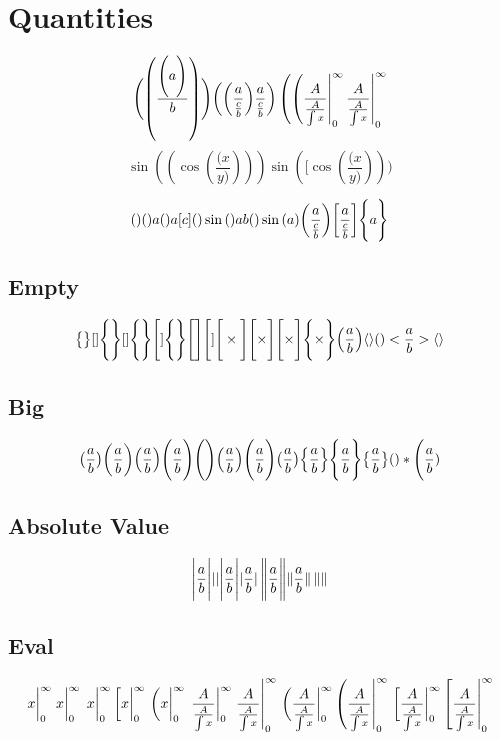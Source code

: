 \documentclass{article}
\begin{document}
\section*{Quantities}

\[
  \pqty\Bigg{\pqty{\frac{\pqty\Bigg{a}}{b}}}
  \qty(  \qty(\frac{a}{\frac{c}{b}})\frac{a}{\frac{c}{b}})
    \eval(  \eval(\frac{A}{\frac{A}{\int x}}|_0^\infty\frac{A}{\frac{A}{\int x}}|_0^\infty
  \]
\[
  \sin((\cos({\frac{(x}{y)}})))
  \sin([\cos({\frac{(x}{y)}})))
\]



\[
  \quantity
  \quantity a
  \quantity\bigg a
  \quantity[c]
  \quantity\sin
  \qty\Bigg ab
  \quantity\bigg\sin
  \qty(a)
  \qty(\frac{a}{\frac{c}{b}})
  \qty[\frac{a}{\frac{c}{b}}]
  \qty\Bigg{a}
\]

\subsection*{Empty}

\[
  \qty\big{}[]
  \qty\Bigg{}[]
  \qty\Bigg{}\Bigg[]
  \qty\Bigg{}\qty\Bigg[]
  \Bigg[]
  \Bigg[ \times \Bigg]
  \Biggl[ \times \Biggr]
  \qty\Bigg[\times]
  \qty\Bigg{\times}
  \qty(\frac{a}{b})\langle\rangle
  \qty<\frac{a}{b}>\langle\rangle
\]

\subsection*{Big}

\[
  \quantity\big(\frac{a}{b})
  \quantity\bigg(\frac{a}{b})
  \quantity\Big(\frac{a}{b})
  \quantity\Bigg(\frac{a}{b})
  \pqty\Bigg{} 
  \pqty{\frac{a}{b}}
  \pqty\Bigg{\frac{a}{b}}
  \pqty\big{\frac{a}{b}}
  \Bqty{\frac{a}{b}}
  \Bqty\Bigg{\frac{a}{b}}
  \Bqty\big{\frac{a}{b}}
  \quantity*\Bigg(\frac{a}{b})
\]

\subsection*{Absolute Value}
\[
  \absolutevalue\Bigg{\frac{a}{b}}
  \absolutevalue{}
  \abs\Bigg{\frac{a}{b}}
  \abs*\Bigg{\frac{a}{b}}
  \norm\Bigg{\frac{a}{b}}
  \norm*\Bigg{\frac{a}{b}}
  \norm{}
\]


\newpage
\subsection*{Eval}

\[
  \evaluated{x}_0^\infty
  \eval{x}_0^\infty
  \eval*{x}_0^\infty
  \eval[x|_0^\infty
  \eval*(x|_0^\infty
  \eval*{\frac{A}{\frac{A}{\int x}}}_0^\infty
  \eval{\frac{A}{\frac{A}{\int x}}}_0^\infty
  \eval*(\frac{A}{\frac{A}{\int x}}|_0^\infty
  \eval(\frac{A}{\frac{A}{\int x}}|_0^\infty
  \eval*[\frac{A}{\frac{A}{\int x}}|_0^\infty
  \eval[\frac{A}{\frac{A}{\int x}}|_0^\infty
\]
\end{document}
